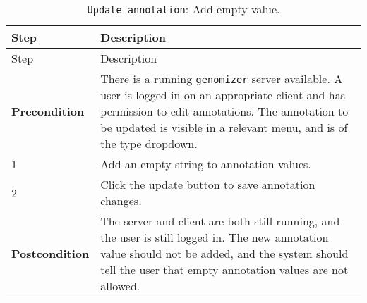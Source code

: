 \begin{longtable}[c]{@{}ll@{}}
\caption{\texttt{Update\ annotation}: Add empty value.}\tabularnewline
\toprule
\begin{minipage}[b]{0.31\columnwidth}\raggedright\strut
Step
\strut\end{minipage} &
\begin{minipage}[b]{0.63\columnwidth}\raggedright\strut
Description
\strut\end{minipage}\tabularnewline
\midrule
\endfirsthead
\toprule
\begin{minipage}[b]{0.31\columnwidth}\raggedright\strut
Step
\strut\end{minipage} &
\begin{minipage}[b]{0.63\columnwidth}\raggedright\strut
Description
\strut\end{minipage}\tabularnewline
\midrule
\endhead
\begin{minipage}[t]{0.31\columnwidth}\raggedright\strut
\textbf{Precondition}
\strut\end{minipage} &
\begin{minipage}[t]{0.63\columnwidth}\raggedright\strut
There is a running \texttt{genomizer} server available. A user is logged
in on an appropriate client and has permission to edit annotations. The
annotation to be updated is visible in a relevant menu, and is of the
type dropdown.
\strut\end{minipage}\tabularnewline
\begin{minipage}[t]{0.31\columnwidth}\raggedright\strut
1
\strut\end{minipage} &
\begin{minipage}[t]{0.63\columnwidth}\raggedright\strut
Add an empty string to annotation values.
\strut\end{minipage}\tabularnewline
\begin{minipage}[t]{0.31\columnwidth}\raggedright\strut
2
\strut\end{minipage} &
\begin{minipage}[t]{0.63\columnwidth}\raggedright\strut
Click the update button to save annotation changes.
\strut\end{minipage}\tabularnewline
\begin{minipage}[t]{0.31\columnwidth}\raggedright\strut
\textbf{Postcondition}
\strut\end{minipage} &
\begin{minipage}[t]{0.63\columnwidth}\raggedright\strut
The server and client are both still running, and the user is still
logged in. The new annotation value should not be added, and the system
should tell the user that empty annotation values are not allowed.
\strut\end{minipage}\tabularnewline
\bottomrule
\end{longtable}

